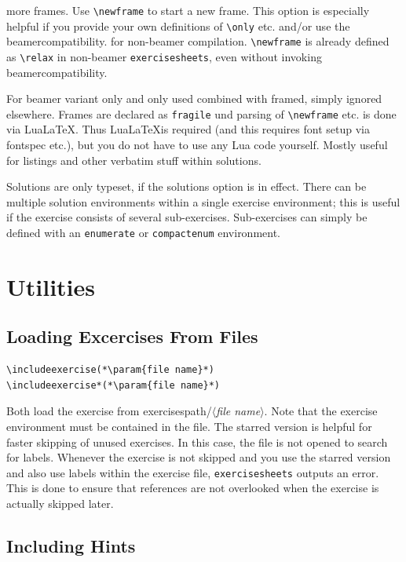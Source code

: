 \documentclass[DIV12,BCOR0mm]{scrartcl}
\newcommand{\exsh}{\texttt{exercisesheets}\xspace}
\newcommand{\param}[1]{$\langle${\normalfont\itshape #1\/}$\rangle$}
\newcommand{\codestyle}{\normalfont\ttfamily\color{blue!50!black}}
\newcommand{\optionstyle}{\normalfont\ttfamily\color{red!50!black}}
\newcommand{\option}[1]{{\optionstyle #1}}
\newcommand{\optitem}[1][]{\item[{\codestyle #1}]}
\begin{document}
\begin{description}
 more frames. Use \lstinline|\newframe| to start a new frame. This
 option is especially helpful if you provide your own definitions
 of \lstinline|\only| etc. and/or use the \option{beamercompatibility}.
 for non-beamer compilation. \lstinline|\newframe|
 is already defined as \lstinline|\relax| in  non-beamer \exsh,
 even without invoking \option{beamercompatibility}.
 \optitem[{\option{fragile}}] For beamer variant only and only
 used combined with framed, simply ignored elsewhere. Frames are
 declared as \texttt{fragile} und parsing of \lstinline|\newframe|
 etc. is done via Lua\LaTeX. Thus Lua\LaTeX is required
 (and this requires font setup via fontspec etc.), but
 you do not have to use any Lua code yourself. Mostly useful
 for listings and other verbatim stuff within solutions.
\end{description}

Solutions are only typeset, if the \option{solutions} option is in effect. There
can be multiple solution environments within a single exercise environment; this
is useful if the exercise consists of several sub-exercises. Sub-exercises can
simply be defined with an \texttt{enumerate} or \texttt{compactenum}
environment.

\section{Utilities}

\subsection{Loading Excercises From Files}
\begin{lstlisting}
\includeexercise(*\param{file name}*)
\includeexercise*(*\param{file name}*)
\end{lstlisting}

Both load the exercise from exercisespath/\param{file name}. Note
that the exercise environment must be contained in the file. The
starred version is helpful for faster skipping of unused exercises.
In this case, the file is not opened to search for labels. Whenever
the exercise is not skipped and you use the starred version and also
use labels within the exercise file, \exsh outputs an error. This is
done to ensure that references are not overlooked when the exercise
is actually skipped later.

\subsection{Including Hints}
\end{document}
